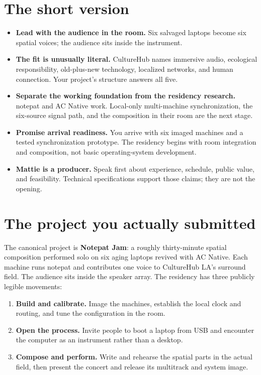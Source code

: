 \documentclass[11pt,letterpaper]{article}
\begin{document}
\section{The short version}

\begin{itemize}
  \item \textbf{Lead with the audience in the room.} Six salvaged laptops become
  six spatial voices; the audience sits inside the instrument.
  \item \textbf{The fit is unusually literal.} CultureHub names immersive audio,
  ecological responsibility, old-plus-new technology, localized networks, and
  human connection. Your project's structure answers all five.
  \item \textbf{Separate the working foundation from the residency research.}
  notepat and AC Native work. Local-only multi-machine synchronization, the
  six-source signal path, and the composition in their room are the next stage.
  \item \textbf{Promise arrival readiness.} You arrive with six imaged machines
  and a tested synchronization prototype. The residency begins with room
  integration and composition, not basic operating-system development.
  \item \textbf{Mattie is a producer.} Speak first about experience, schedule,
  public value, and feasibility. Technical specifications support those claims;
  they are not the opening.
\end{itemize}

\section{The project you actually submitted}

The canonical project is \textbf{Notepat Jam}: a roughly thirty-minute spatial
composition performed solo on six aging laptops revived with AC Native. Each
machine runs notepat and contributes one voice to CultureHub LA's surround
field. The audience sits inside the speaker array. The residency has three
publicly legible movements:

\begin{enumerate}
  \item \textbf{Build and calibrate.} Image the machines, establish the local
  clock and routing, and tune the configuration in the room.
  \item \textbf{Open the process.} Invite people to boot a laptop from USB and
  encounter the computer as an instrument rather than a desktop.
  \item \textbf{Compose and perform.} Write and rehearse the spatial parts in the
  actual field, then present the concert and release its multitrack and system
  image.
\end{enumerate}
\end{document}
